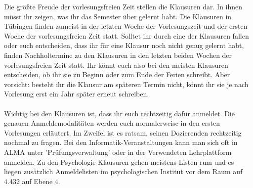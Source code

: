 Die größte Freude der vorlesungsfreien Zeit stellen die Klausuren dar. In ihnen müsst ihr zeigen, was ihr das Semester über gelernt habt. Die Klausuren in Tübingen finden zumeist in der letzten Woche der Vorlesungszeit und der ersten Woche der vorlesungsfreien Zeit statt. Solltet ihr durch eine der Klausuren fallen oder euch entscheiden, dass ihr für eine Klausur noch nicht genug gelernt habt, finden Nachholtermine zu den Klausuren in den letzten beiden Wochen der vorlesungsfreien Zeit statt. Ihr könnt euch also bei den meisten Klausuren entscheiden, ob ihr sie zu Beginn oder zum Ende der Ferien schreibt. Aber vorsicht: besteht ihr die Klausur am späteren Termin nicht, könnt ihr sie je nach Vorlesung erst ein Jahr später erneut schreiben.\\
\\
Wichtig bei den Klausuren ist, dass ihr euch rechtzeitig dafür anmeldet. Die genauen Anmeldemodalitäten werden euch normalerweise in den ersten Vorlesungen erläutert. Im Zweifel ist es ratsam, seinen Dozierenden rechtzeitig nochmal zu fragen. Bei den Informatik-Veranstaltungen kann man sich oft in ALMA unter 'Prüfungsverwaltung' oder in der Verwendeten Lehrplattform anmelden. Zu den Psychologie-Klausuren gehen meistens Listen rum und es liegen zusätzlich Anmeldelisten im psychologischen Institut vor dem Raum auf 4.432 auf Ebene 4.

